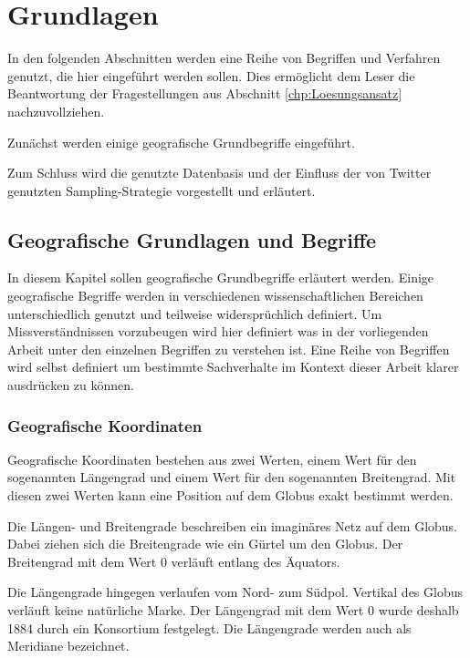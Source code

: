 \chapter{Grundlagen} \label{chp:Grundlagen}  
In den folgenden Abschnitten werden eine Reihe von Begriffen und Verfahren genutzt, die hier eingeführt werden sollen.     
Dies ermöglicht dem Leser die Beantwortung der Fragestellungen aus Abschnitt \ref{chp:Loesungsansatz} nachzuvollziehen.    
 
Zunächst werden einige geografische Grundbegriffe eingeführt. 

 
Zum Schluss wird die genutzte Datenbasis und der Einfluss der von Twitter genutzten Sampling-Strategie vorgestellt und erläutert.

\newpage

	\section{Geografische Grundlagen und Begriffe}
	
		In diesem Kapitel sollen geografische Grundbegriffe erläutert werden. 
		Einige geografische Begriffe werden in verschiedenen wissenschaftlichen Bereichen unterschiedlich genutzt und teilweise widersprüchlich definiert. 
		Um Missverständnissen vorzubeugen wird hier definiert was in der vorliegenden Arbeit unter den einzelnen Begriffen zu verstehen ist.
		Eine Reihe von Begriffen wird selbst definiert um bestimmte Sachverhalte im Kontext dieser Arbeit klarer ausdrücken zu können. 

		\subsection{Geografische Koordinaten}
			
			Geografische Koordinaten bestehen aus zwei Werten, einem Wert für den sogenannten Längengrad und einem Wert für den sogenannten Breitengrad.
			Mit diesen zwei Werten kann eine Position auf dem Globus exakt bestimmt werden.  
			
			Die Längen- und Breitengrade beschreiben ein imaginäres Netz auf dem Globus. 
			Dabei ziehen sich die Breitengrade wie ein Gürtel um den Globus.
			Der Breitengrad mit dem Wert 0 verläuft entlang des Äquators.

			Die Längengrade hingegen verlaufen vom Nord- zum Südpol. 
			Vertikal des Globus verläuft keine natürliche Marke. 
			Der Längengrad mit dem Wert 0 wurde deshalb 1884 durch ein Konsortium festgelegt.
			Die Längengrade werden auch als Meridiane bezeichnet.
			
